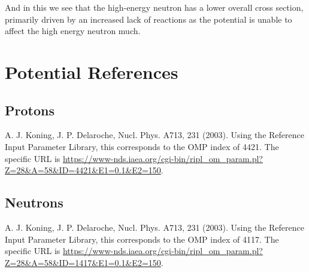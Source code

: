 \documentclass[paper=a4, fontsize=11pt]{scrartcl} %
\numberwithin{equation}{section} %
\numberwithin{figure}{section} %
\numberwithin{table}{section} %
\begin{document}
And in this we see that the high-energy neutron has a lower overall cross section, primarily driven by an increased lack of reactions as the potential is unable to affect the high energy neutron much.
\section{ Potential References}

\subsection{Protons} A. J. Koning, J. P. Delaroche, Nucl. Phys. A713, 231 (2003). Using the Reference Input Parameter Library, this corresponds to the OMP index of 4421. The specific URL is \url{https://www-nds.iaea.org/cgi-bin/ripl_om_param.pl?Z=28&A=58&ID=4421&E1=0.1&E2=150}.
\subsection{Neutrons}A. J. Koning, J. P. Delaroche, Nucl. Phys. A713, 231 (2003). Using the Reference Input Parameter Library, this corresponds to the OMP index of 4117. The specific URL is \url{https://www-nds.iaea.org/cgi-bin/ripl_om_param.pl?Z=28&A=58&ID=1417&E1=0.1&E2=150}.
\end{document}
